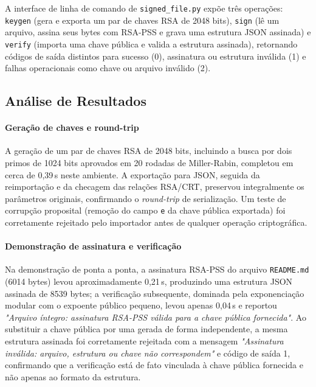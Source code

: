 \documentclass[conference]{IEEEtran}
\begin{document}
A interface de linha de comando de \texttt{signed\_file.py} expõe três operações: \texttt{keygen}
(gera e exporta um par de chaves RSA de 2048 bits), \texttt{sign} (lê um arquivo, assina seus
bytes com RSA-PSS e grava uma estrutura JSON assinada) e \texttt{verify} (importa uma chave
pública e valida a estrutura assinada), retornando códigos de saída distintos para sucesso (0),
assinatura ou estrutura inválida (1) e falhas operacionais como chave ou arquivo inválido (2).

\subsection{Análise de Resultados}

\paragraph{Geração de chaves e round-trip}
A geração de um par de chaves RSA de 2048 bits, incluindo a busca por dois primos de 1024 bits
aprovados em 20 rodadas de Miller-Rabin, completou em cerca de 0,39\,s neste ambiente. A
exportação para JSON, seguida da reimportação e da checagem das relações RSA/CRT, preservou
integralmente os parâmetros originais, confirmando o \textit{round-trip} de serialização.
Um teste de corrupção proposital (remoção do campo \texttt{e} da chave pública exportada) foi
corretamente rejeitado pelo importador antes de qualquer operação criptográfica.

\paragraph{Demonstração de assinatura e verificação}
Na demonstração de ponta a ponta, a assinatura RSA-PSS do arquivo \texttt{README.md}
(6014 bytes) levou aproximadamente 0,21\,s, produzindo uma estrutura JSON assinada de
8539 bytes; a verificação subsequente, dominada pela exponenciação modular com o expoente
público pequeno, levou apenas 0,04\,s e reportou
\textit{"Arquivo íntegro: assinatura RSA-PSS válida para a chave pública fornecida"}. Ao
substituir a chave pública por uma gerada de forma independente, a mesma estrutura assinada
foi corretamente rejeitada com a mensagem \textit{"Assinatura inválida: arquivo, estrutura ou
chave não correspondem"} e código de saída 1, confirmando que a verificação está de fato
vinculada à chave pública fornecida e não apenas ao formato da estrutura.
\end{document}

